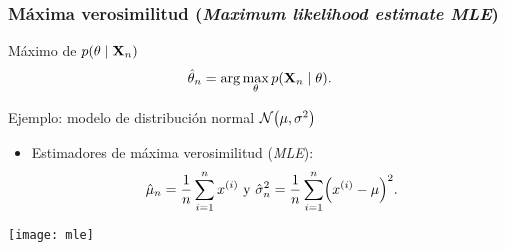 \documentclass[table]{beamer}
\begin{document}
\begin{frame}
    \frametitle{Máxima verosimilitud (\emph{Maximum likelihood estimate MLE})}
    \begin{block}{Máximo de $\pdf{\theta \mid \Xvec_{n}}$}
        \begin{equation*}
            \hat{\theta}_{n}
            = \arg \max_{\theta} \pdf{\Xvec_{n} \mid \theta} .
        \end{equation*}
    \end{block}
    \begin{exampleblock}{Ejemplo: modelo de distribución normal $\normal{\mu}{\sigma^{2}}$}
        \begin{itemize}
            \item Estimadores de máxima verosimilitud (\emph{MLE}):
                \begin{equation*}
                    \hat{\mu}_{n} = \frac{1}{n} \sum_{i = 1}^{n} x^{\parens{i}} \text{ y }
                    \hat{\sigma}^{2}_{n} = \frac{1}{n} \sum_{i = 1}^{n} \parens{x^{\parens{i}} - \mu}^{2} .
                \end{equation*}
        \end{itemize}
    \end{exampleblock}
    \begin{center}
        \texttt{[image: mle]}
    \end{center}
\end{frame}
\end{document}
